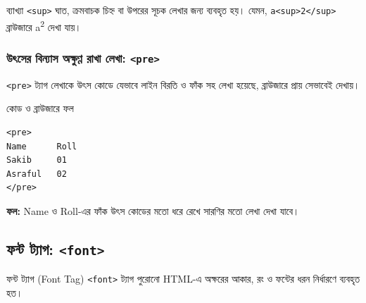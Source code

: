 \begin{keypointbox}{ব্যাখ্যা}
\texttt{<sup>} ঘাত, ক্রমবাচক চিহ্ন বা উপরের সূচক লেখার জন্য ব্যবহৃত হয়। যেমন, \texttt{a<sup>2</sup>} ব্রাউজারে a\textsuperscript{2} দেখা যায়।
\end{keypointbox}

\subsubsection{উৎসের বিন্যাস অক্ষুণ্ণ রাখা লেখা: \texttt{<pre>}}

\texttt{<pre>} ট্যাগ লেখাকে উৎস কোডে যেভাবে লাইন বিরতি ও ফাঁক সহ লেখা হয়েছে, ব্রাউজারে প্রায় সেভাবেই দেখায়।

\begin{chFourWholeExample}{কোড ও ব্রাউজারে ফল}
\noindent
\begin{minipage}[t]{.50\linewidth}\vspace{0pt}

\begin{verbatim}
<pre>
Name      Roll
Sakib     01
Asraful   02
</pre>
\end{verbatim}

\end{minipage}\hfill
\begin{minipage}[t]{.46\linewidth}\vspace{0pt}
\textbf{ফল:} Name ও Roll-এর ফাঁক উৎস কোডের মতো ধরে রেখে সারণির মতো লেখা দেখা যাবে।\\
\end{minipage}
\end{chFourWholeExample}



\subsection{ফন্ট ট্যাগ: \texttt{<font>}}

\begin{definitionbox}{ফন্ট ট্যাগ (Font Tag)}
\texttt{<font>} ট্যাগ পুরোনো HTML-এ অক্ষরের আকার, রং ও ফন্টের ধরন নির্ধারণে ব্যবহৃত হত।
\end{definitionbox}

